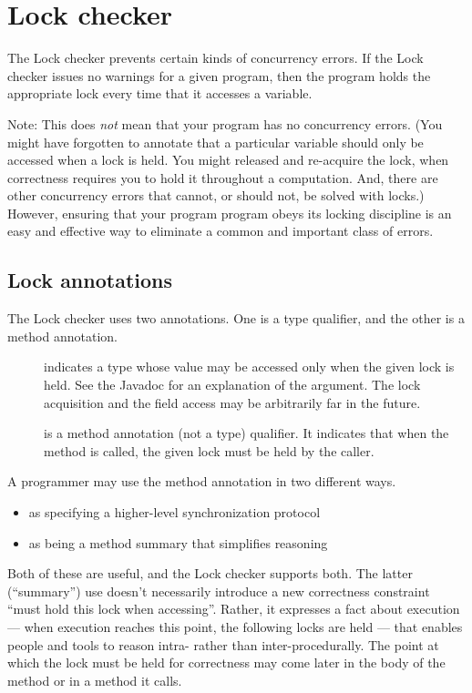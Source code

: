 \htmlhr
\section{Lock checker\label{lock-checker}}

The Lock checker prevents certain kinds of concurrency errors.  If the Lock
checker issues no warnings for a given program, then the program holds the
appropriate lock every time that it accesses a variable.

Note:  This does \emph{not} mean that your program has no concurrency
errors.  (You might have forgotten to annotate that a particular variable
should only be accessed when a lock is held.  You might released and
re-acquire the lock, when correctness requires you to hold it throughout a
computation.  And, there are other concurrency errors that cannot, or
should not, be solved with locks.)  However, ensuring that your program
program obeys its locking discipline is an easy and effective way to
eliminate a common and important class of errors.


\subsection{Lock annotations\label{lock-annotations}}

The Lock checker uses two annotations.  One is a type qualifier, and the
other is a method annotation.

\begin{description}

\item[]
  indicates a type whose value may be accessed only when the given lock is
  held.  See the Javadoc for an explanation of the argument.  The lock
  acquisition and the field access may be arbitrarily far in the future.

\item[]
  is a method annotation (not a type) qualifier.  It indicates that when
  the method is called, the given lock must be held by the caller.

\end{description}


A programmer may use the  method annotation in two different ways.
\begin{itemize}
\item
  as specifying a higher-level synchronization protocol
\item
  as being a method summary that simplifies reasoning
\end{itemize}
\noindent
Both of these are useful, and the Lock checker supports both.
The latter (``summary'') use doesn't necessarily introduce a new
correctness constraint ``must hold this lock when accessing''.  Rather,
it expresses a fact about execution --- when execution reaches this
point, the following locks are held --- that enables people and tools to
reason intra- rather than inter-procedurally.  The point at which the
lock must be held for correctness may come later in the body of the
method or in a method it calls.


